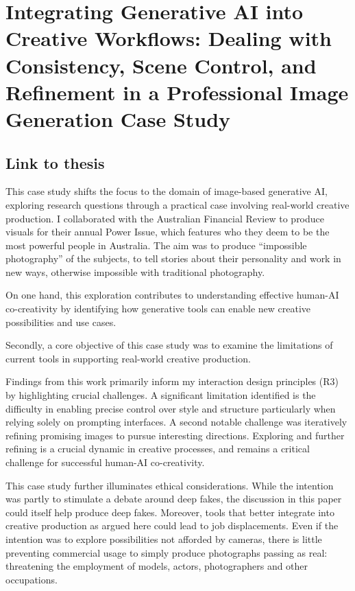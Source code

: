 \chapter{Integrating Generative AI into Creative Workflows: Dealing with Consistency, Scene Control, and Refinement in a Professional Image Generation Case Study} \label{c:tc6} 

\section{Link to thesis}

This case study shifts the focus to the domain of image-based generative AI, exploring research questions through a practical case involving real-world creative production. I collaborated with the Australian Financial Review to produce visuals for their annual Power Issue, which features who they deem to be the most powerful people in Australia. The aim was to produce “impossible photography” of the subjects, to tell stories about their personality and work in new ways, otherwise impossible with traditional photography. 

On one hand, this exploration contributes to understanding effective human-AI co-creativity by identifying how generative tools can enable new creative possibilities and use cases.

Secondly, a core objective of this case study was to examine the limitations of current tools in supporting real-world creative production. 

Findings from this work primarily inform my interaction design principles (R3) by highlighting crucial challenges. A significant limitation identified is the difficulty in enabling precise control over style and structure particularly when relying solely on prompting interfaces. A second notable challenge was iteratively refining promising images to pursue interesting directions. Exploring and further refining is a crucial dynamic in creative processes, and remains a critical challenge for successful human-AI co-creativity. 

This case study further illuminates ethical considerations. While the intention was partly to stimulate a debate around deep fakes, the discussion in this paper could itself help produce deep fakes. Moreover, tools that better integrate into creative production as argued here could lead to job displacements. Even if the intention was to explore possibilities not afforded by cameras, there is little preventing commercial usage to simply produce photographs passing as real: threatening the employment of models, actors, photographers and other occupations. 




